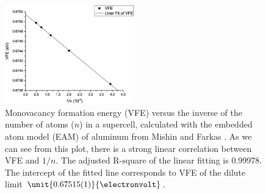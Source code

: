 \documentclass[%
 reprint,
 amsmath,amssymb,
 aps,
]{revtex4-1}
\begin{document}
\begin{figure}
\includegraphics[width=0.5\textwidth]{AlMishinVFEFitting}%
\caption{\label{fig:VFEFitting}
  Monovacancy formation energy (VFE) versus the inverse of the number of atoms ($n$) in a supercell, calculated with the embedded atom model (EAM) of aluminum from Mishin and Farkas \cite{mishin1999interatomic}.
  As we can see from this plot, there is a strong linear correlation between VFE and $1/n$.
  The adjusted R-square of the linear fitting is 0.99978.
  The intercept of the fitted line corresponds to VFE of the dilute limit $\unit{0.67515(1)}{\electronvolt}$.
}
\end{figure}
\end{document}
